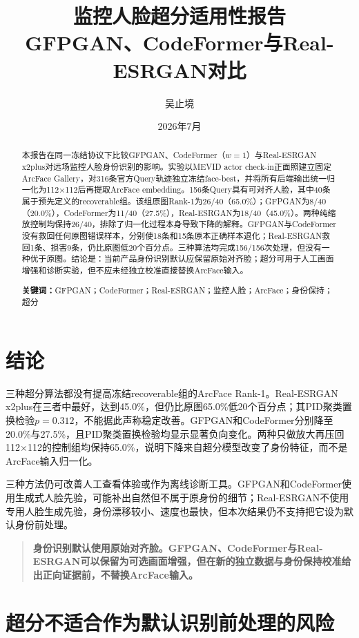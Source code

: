 \documentclass[UTF8,a4paper,11pt]{ctexart}
\title{\textbf{监控人脸超分适用性报告}\\
\large GFPGAN、CodeFormer与Real-ESRGAN对比}
\author{吴止境}
\date{2026年7月}
\begin{document}
\pagestyle{plain}
\maketitle

\begin{abstract}
本报告在同一冻结协议下比较GFPGAN、CodeFormer（$w=1$）与Real-ESRGAN x2plus对远场监控人脸身份识别的影响。实验以MEVID actor check-in正面照建立固定ArcFace Gallery，对316条官方Query轨迹独立冻结face-best，并将所有后端输出统一归一化为112$\times$112后再提取ArcFace embedding。156条Query具有可对齐人脸，其中40条属于预先定义的recoverable组。该组原图Rank-1为26/40（65.0\%）；GFPGAN为8/40（20.0\%），CodeFormer为11/40（27.5\%），Real-ESRGAN为18/40（45.0\%）。两种纯缩放控制均保持26/40，排除了归一化过程本身导致下降的解释。GFPGAN与CodeFormer没有救回任何原图错误样本，分别使18条和15条原本正确样本退化；Real-ESRGAN救回1条、损害9条，仍比原图低20个百分点。三种算法均完成156/156次处理，但没有一种优于原图。结论是：当前产品身份识别默认应保留原始对齐脸；超分可用于人工画面增强和诊断实验，但不应未经独立校准直接替换ArcFace输入。

\textbf{关键词：}GFPGAN；CodeFormer；Real-ESRGAN；监控人脸；ArcFace；身份保持；超分
\end{abstract}

\section{结论}

三种超分算法都没有提高冻结recoverable组的ArcFace Rank-1。Real-ESRGAN x2plus在三者中最好，达到45.0\%，但仍比原图65.0\%低20个百分点；其PID聚类置换检验$p=0.312$，不能据此声称稳定改善。GFPGAN和CodeFormer分别降至20.0\%与27.5\%，且PID聚类置换检验均显示显著负向变化。两种只做放大再压回112$\times$112的控制组均保持65.0\%，说明下降来自超分模型改变了身份特征，而不是ArcFace输入归一化。

三种方法仍可改善人工查看体验或作为离线诊断工具。GFPGAN和CodeFormer使用生成式人脸先验，可能补出自然但不属于原身份的细节；Real-ESRGAN不使用专用人脸生成先验，身份漂移较小、速度也最快，但本次结果仍不支持把它设为默认身份前处理。

\begin{quote}
\textbf{身份识别默认使用原始对齐脸。GFPGAN、CodeFormer与Real-ESRGAN可以保留为可选画面增强，但在新的独立数据与身份保持校准给出正向证据前，不替换ArcFace输入。}
\end{quote}

\section{超分不适合作为默认识别前处理的风险}
\end{document}
